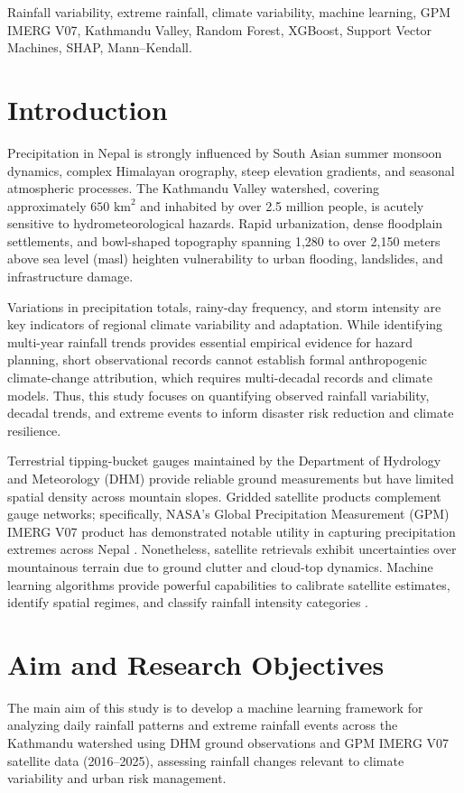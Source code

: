 \documentclass[conference]{IEEEtran}
\begin{document}
\begin{IEEEkeywords}
Rainfall variability, extreme rainfall, climate variability, machine learning, GPM IMERG V07, Kathmandu Valley, Random Forest, XGBoost, Support Vector Machines, SHAP, Mann--Kendall.
\end{IEEEkeywords}


\section{Introduction}
\label{sec:introduction}
Precipitation in Nepal is strongly influenced by South Asian summer monsoon dynamics, complex Himalayan orography, steep elevation gradients, and seasonal atmospheric processes. The Kathmandu Valley watershed, covering approximately $650\text{ km}^2$ and inhabited by over 2.5 million people, is acutely sensitive to hydrometeorological hazards. Rapid urbanization, dense floodplain settlements, and bowl-shaped topography spanning 1,280 to over 2,150 meters above sea level (masl) heighten vulnerability to urban flooding, landslides, and infrastructure damage.

Variations in precipitation totals, rainy-day frequency, and storm intensity are key indicators of regional climate variability and adaptation. While identifying multi-year rainfall trends provides essential empirical evidence for hazard planning, short observational records cannot establish formal anthropogenic climate-change attribution, which requires multi-decadal records and climate models. Thus, this study focuses on quantifying observed rainfall variability, decadal trends, and extreme events to inform disaster risk reduction and climate resilience.

Terrestrial tipping-bucket gauges maintained by the Department of Hydrology and Meteorology (DHM) provide reliable ground measurements but have limited spatial density across mountain slopes. Gridded satellite products complement gauge networks; specifically, NASA's Global Precipitation Measurement (GPM) IMERG V07 product has demonstrated notable utility in capturing precipitation extremes across Nepal \cite{sharma2020}. Nonetheless, satellite retrievals exhibit uncertainties over mountainous terrain due to ground clutter and cloud-top dynamics. Machine learning algorithms provide powerful capabilities to calibrate satellite estimates, identify spatial regimes, and classify rainfall intensity categories \cite{khanal2024, lei2025}.


\section{Aim and Research Objectives}
\label{sec:objectives}
The main aim of this study is to develop a machine learning framework for analyzing daily rainfall patterns and extreme rainfall events across the Kathmandu watershed using DHM ground observations and GPM IMERG V07 satellite data (2016--2025), assessing rainfall changes relevant to climate variability and urban risk management.
\end{document}

